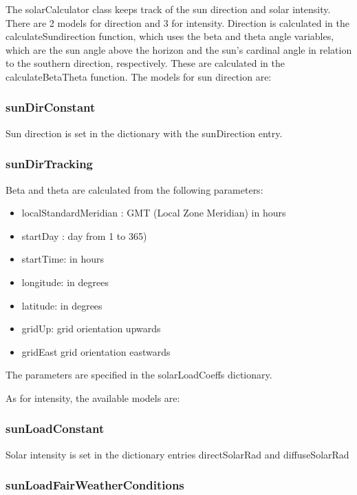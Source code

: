 The solarCalculator class keeps track of the sun direction and solar intensity. There are 2 models for direction and 3 for intensity. Direction is calculated in the calculateSundirection function, which uses the beta and theta angle variables, which are the sun angle above the horizon and the sun's cardinal angle in relation to the southern direction, respectively. These are calculated in the calculateBetaTheta function. The models for sun direction are:

\subsubsection{sunDirConstant}

Sun direction is set in the dictionary with the sunDirection entry.

\subsubsection{sunDirTracking}

Beta and theta are calculated from the following parameters:
\begin{itemize}
    \item localStandardMeridian : GMT (Local Zone Meridian) in hours
    \item startDay :  day from 1 to 365)
    \item startTime:  in hours
    \item longitude:  in degrees
    \item latitude:   in degrees
    \item gridUp:     grid orientation upwards
    \item gridEast    grid orientation eastwards
\end{itemize}
            
The parameters are specified in the solarLoadCoeffs dictionary.


As for intensity, the available models are:

\subsubsection{sunLoadConstant}

Solar intensity is set in the dictionary entries directSolarRad and diffuseSolarRad

\subsubsection{sunLoadFairWeatherConditions}

